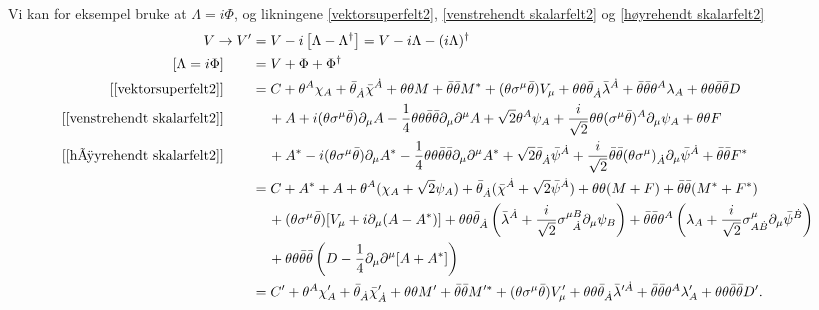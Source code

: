 \documentclass[notes.tex]{subfiles}
\begin{document}
\begin{Answer}
Vi kan for eksempel bruke at $\Lambda = i \Phi$, og likningene \eqref{vektorsuperfelt2}, \eqref{venstrehendt skalarfelt2} og  \eqref{høyrehendt skalarfelt2}
\begin{align}
    V \to V' &= V - i \left[\Lambda - \Lambda^\dagger \right] = V - i\Lambda - (i\Lambda)^\dagger \nonumber\\
   [\Lambda = i\Phi]\quad \quad  &= V + \Phi + \Phi^\dagger \nonumber \\
   [\eqref{vektorsuperfelt2}] \quad \quad &=
   C + \theta^{A}\chi_A + \bar{\theta}_{\dot{A}}\bar{\chi}^{\dot{A}} + \theta \theta M + \bar{\theta}\bar{\theta}M^* + (\theta \sigma^\mu \bar{\theta})V_{\mu} + \theta \theta \bar{\theta}_{\dot{A}}\bar{\lambda}^{\dot{A}} + \bar{\theta}\bar{\theta}\theta^A\lambda_{A} + \theta\theta \bar{\theta}\bar{\theta}D \nonumber \\
    [\eqref{venstrehendt skalarfelt2}] \quad \quad     & \quad \, +A + i(\theta\sigma^\mu\bar{\theta})\partial_\mu A - \frac{1}{4}\theta\theta\bar{\theta}\bar{\theta}\partial_\mu\partial^{\mu}A + \sqrt{2}\theta^A\psi_{A} + \frac{i}{\sqrt{2}}\theta\theta (\sigma^\mu\bar\theta)^A\partial_\mu \psi_A + \theta \theta F \nonumber \\
    [\eqref{høyrehendt skalarfelt2}] \quad \quad    & \quad \, +A^* - i(\theta \sigma^{\mu}\bar{\theta})\partial_\mu A^* - \frac{1}{4}\theta\theta\bar{\theta}\bar{\theta}\partial_\mu\partial^\mu A^* + \sqrt{2}\bar{\theta}_{\dot{A}}\bar{\psi}^{\dot{A}} + \frac{i}{\sqrt{2}}\bar{\theta} \bar{\theta}(\theta\sigma^{\mu})_{\dot{A}}\partial_\mu\bar{\psi}^{\dot{A}} + \bar{\theta}\bar{\theta}F^* \nonumber \\
    &= C + A^* + A + \theta^A( \chi_A + \sqrt{2}\psi_A) + \bar{\theta}_{\dot{A}}(\bar{\chi}^{\dot{A}} + \sqrt{2}\bar{\psi}^{\dot{A}}) + \theta \theta (M + F) + \bar{\theta}\bar{\theta}(M^* + F^*) \nonumber \\
    &\quad \, + (\theta \sigma^\mu \bar{\theta})[V_\mu + i \partial_\mu(A - A^*)] + \theta \theta \bar{\theta}_{\dot{A}}\left( \bar{\lambda}^{\dot{A}} + \frac{i}{\sqrt{2}}\sigma^{\mu B}_{\:\:\,\dot{A}}\partial_\mu \psi_B\right) + \bar{\theta}\bar{\theta}\theta^{A}\left(\lambda_A + \frac{i}{\sqrt{2}}\sigma^{\mu}_{A\dot{B}}\partial_\mu\bar{\psi}^{\dot{B}}\right) \nonumber \\
    & \quad \, + \theta \theta \bar{\theta}\bar{\theta}\left(D -  \frac{1}{4}\partial_\mu \partial^\mu[A + A^*]\right) 
    \label{superjustér-vektortrafo}\\
    &= C' + \theta^A \chi_A' + \bar{\theta}_{\dot{A}}\bar{\chi}_{\dot{A}}' + \theta \theta M' + \bar{\theta}\bar{\theta}M'^* + (\theta \sigma^\mu \bar{\theta})V_{\mu}' + \theta \theta \bar{\theta}_{\dot{A}}\bar{\lambda}'^{\dot{A}} + \bar{\theta}\bar{\theta}\theta^A\lambda_{A}' + \theta\theta \bar{\theta}\bar{\theta}D'.\nonumber

\end{align}
\end{Answer}
\end{document}
